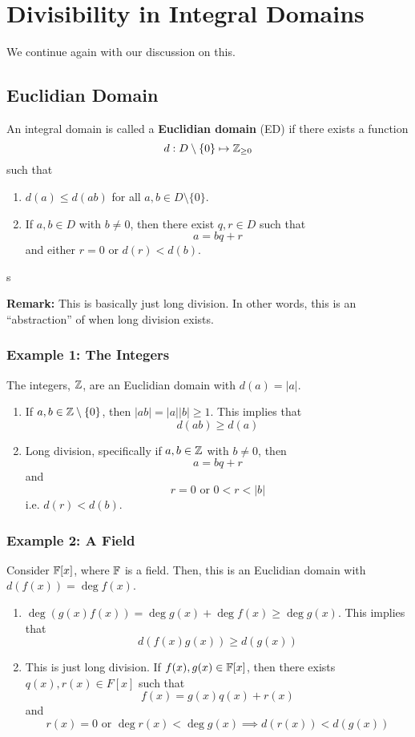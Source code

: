 \documentclass[letterpaper]{article}
\begin{document}
\section{Divisibility in Integral Domains}
We continue again with our discussion on this. 

\subsection{Euclidian Domain}
\begin{definition}{}{}
    An integral domain is called a \textbf{Euclidian domain} (ED) if there exists a function 
    \[d: D \setminus \{0\} \mapsto \mathbb{Z}_{\geq 0}\]
    such that
    \begin{enumerate}
        \item $d(a) \leq d(ab)$ for all $a, b \in D \setminus \{0\}$.
        \item If $a, b \in D$ with $b \neq 0$, then there exist $q, r \in D$ such that
        \[a = bq + r\]
        and either $r = 0$ or $d(r) < d(b)$. 
    \end{enumerate}s
\end{definition}
\textbf{Remark:} This is basically just long division. In other words, this is an ``abstraction'' of when long division exists. 

\subsubsection{Example 1: The Integers}
The integers, $\mathbb{Z}$, are an Euclidian domain with $d(a) = |a|$. 
\begin{enumerate}
    \item If $a, b \in \mathbb{Z} \setminus \{0\}$, then $|ab| = |a||b| \geq 1$. This implies that 
    \[d(ab) \geq d(a)\]
    \item Long division, specifically if $a, b \in \mathbb{Z}$ with $b \neq 0$, then 
    \[a = bq + r\]
    and 
    \[r = 0 \text{ or } 0 < r < |b|\]
    i.e. $d(r) < d(b)$. 
\end{enumerate}

\subsubsection{Example 2: A Field}
Consider $\mathbb{F}[x]$, where $\mathbb{F}$ is a field. Then, this is an Euclidian domain with $d(f(x)) = \deg f(x)$. 
\begin{enumerate}
    \item $\deg(g(x)f(x)) = \deg g(x) + \deg f(x) \geq \deg g(x)$. This implies that 
    \[d(f(x) g(x)) \geq d(g(x))\]

    \item This is just long division. If $f(x), g(x) \in \mathbb{F}[x]$, then there exists $q(x), r(x) \in F[x]$ such that 
    \[f(x) = g(x)q(x) + r(x)\]
    and 
    \[r(x) = 0 \text{ or } \deg r(x) < \deg g(x) \implies d(r(x)) < d(g(x))\]
\end{enumerate}
\end{document}
